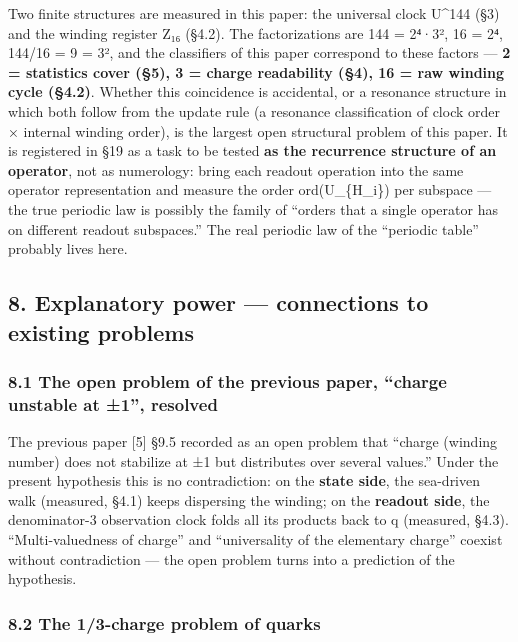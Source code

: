 \documentclass[
]{article}
\begin{document}
Two finite structures are measured in this paper: the universal clock
U\^{}144 (§3) and the winding register Z₁₆ (§4.2). The factorizations
are 144 = 2⁴·3², 16 = 2⁴, 144/16 = 9 = 3², and the classifiers of this
paper correspond to these factors --- \textbf{2 = statistics cover (§5),
3 = charge readability (§4), 16 = raw winding cycle (§4.2)}. Whether
this coincidence is accidental, or a resonance structure in which both
follow from the update rule (a resonance classification of clock order ×
internal winding order), is the largest open structural problem of this
paper. It is registered in §19 as a task to be tested \textbf{as the
recurrence structure of an operator}, not as numerology: bring each
readout operation into the same operator representation and measure the
order ord(U\textbar\_\{H\_i\}) per subspace --- the true periodic law is
possibly the family of ``orders that a single operator has on different
readout subspaces.'' The real periodic law of the ``periodic table''
probably lives here.

\subsection{8. Explanatory power --- connections to existing
problems}\label{explanatory-power-connections-to-existing-problems}

\subsubsection{8.1 The open problem of the previous paper, ``charge
unstable at ±1'',
resolved}\label{the-open-problem-of-the-previous-paper-charge-unstable-at-1-resolved}

The previous paper {[}5{]} §9.5 recorded as an open problem that
``charge (winding number) does not stabilize at ±1 but distributes over
several values.'' Under the present hypothesis this is no contradiction:
on the \textbf{state side}, the sea-driven walk (measured, §4.1) keeps
dispersing the winding; on the \textbf{readout side}, the denominator-3
observation clock folds all its products back to \textbar q
(measured, §4.3). ``Multi-valuedness of charge'' and ``universality of
the elementary charge'' coexist without contradiction --- the open
problem turns into a prediction of the hypothesis.

\subsubsection{8.2 The 1/3-charge problem of
quarks}\label{the-13-charge-problem-of-quarks}
\end{document}
